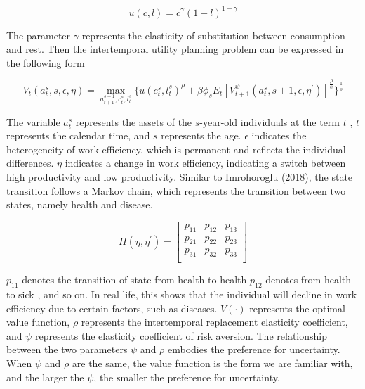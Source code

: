 \documentclass{article}
\begin{document}
        \begin{equation}
            u(c,l)=c^\gamma(1-l)^{1-\gamma}
        \end{equation}

        The parameter $\gamma$ represents the elasticity of substitution between consumption and rest.
        Then the intertemporal utility planning problem can be expressed in the following form

        \begin{equation}
            V_t(a_t^s,s,\epsilon,\eta)=\max_{a_{t+1}^{s+1},c_t^s,l_t^s}
            \Big\{u(c_t^s,l_t^s)^{\rho}+\beta\phi_sE_t[V_{t+1}^\psi(a_t^s,s+1,\epsilon,\eta^{'})]^{\frac{\rho}{\psi}}\Big\}
            ^{\frac{1}{\rho}}
        \end{equation}

        The variable $a_t^s$ represents the assets of the $s$-year-old individuals at the term $t$ , 
        $t$ represents the calendar time, and $s$ represents the age. $\epsilon$ indicates the heterogeneity 
        of work efficiency, which is permanent and reflects the individual differences. $\eta$ indicates a change 
        in work efficiency, indicating a switch between high productivity and low productivity. 
        Similar to Imrohoroglu (2018), the state transition follows a Markov chain, which represents the transition between two states, namely health and disease.

        \begin{equation}
            \Pi(\eta,\eta^{'})=  
            \left[
                \begin{array}{ccc}
                    p_{11} & p_{12} &p_{13} \\
                    p_{21} & p_{22} &p_{23} \\
                    p_{31} & p_{32} &p_{33} \\
                \end{array}  
            \right] 
        \end{equation}
        
        $p_{11}$ denotes the transition of state from health to health $p_{12}$ denotes from health to sick , and so on. 
        In real life, this shows that the individual will decline in work efficiency due to certain factors, 
        such as diseases. $V(\cdot)$ represents the optimal value function, $\rho$ represents the intertemporal replacement 
        elasticity coefficient, and $\psi$ represents the elasticity coefficient of risk aversion.
        The relationship between the two parameters $\psi$ and $\rho$ embodies the preference for uncertainty. 
        When $\psi$ and $\rho$ are the same, the value function is the form we are familiar with, 
        and the larger the $\psi$, the smaller the preference for uncertainty.
\end{document}
